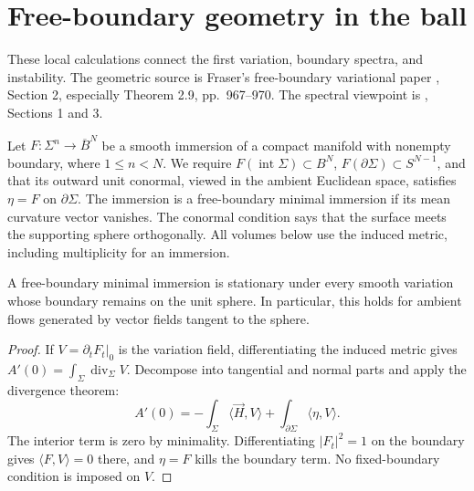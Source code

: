 \chapter{Free-boundary geometry in the ball}\label{sec:free-boundary-ball}
These local calculations connect the first variation, boundary spectra, and instability. The geometric source is Fraser's free-boundary variational paper \cite{Fraser00}, Section 2, especially Theorem 2.9, pp.~967--970. The spectral viewpoint is \cite{FS11}, Sections 1 and 3.

\begin{definition}\label{def:ball-free-boundary}
Let $F:\Sigma^n\to\overline B^N$ be a smooth immersion of a compact manifold with nonempty boundary, where $1\leq n<N$. We require $F(\operatorname{int}\Sigma)\subset B^N$, $F(\partial\Sigma)\subset S^{N-1}$, and that its outward unit conormal, viewed in the ambient Euclidean space, satisfies $\eta=F$ on $\partial\Sigma$. The immersion is a free-boundary minimal immersion if its mean curvature vector vanishes. The conormal condition says that the surface meets the supporting sphere orthogonally. All volumes below use the induced metric, including multiplicity for an immersion.
\end{definition}

\begin{proposition}\label{prop:ball-free-boundary-stationarity}
A free-boundary minimal immersion is stationary under every smooth variation whose boundary remains on the unit sphere. In particular, this holds for ambient flows generated by vector fields tangent to the sphere.
\end{proposition}
\begin{proof}
If $V=\partial_tF_t|_0$ is the variation field, differentiating the induced metric gives $A'(0)=\int_\Sigma\operatorname{div}_\Sigma V$. Decompose into tangential and normal parts and apply the divergence theorem:
\[
 A'(0)=-\int_\Sigma\langle\vec H,V\rangle+\int_{\partial\Sigma}\langle\eta,V\rangle.
\]
The interior term is zero by minimality. Differentiating $|F_t|^2=1$ on the boundary gives $\langle F,V\rangle=0$ there, and $\eta=F$ kills the boundary term. No fixed-boundary condition is imposed on $V$.
\end{proof}

